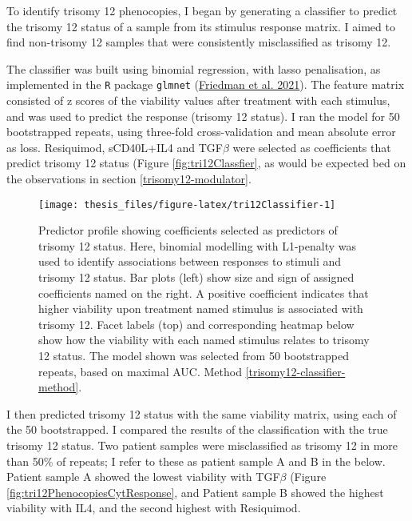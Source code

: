 \documentclass[11pt, a4paper, twosided]{book}
\begin{document}
To identify trisomy 12 phenocopies, I began by generating a classifier to predict the trisomy 12 status of a sample from its stimulus response matrix. I aimed to find non-trisomy 12 samples that were consistently misclassified as trisomy 12.

The classifier was built using binomial regression, with lasso penalisation, as implemented in the \texttt{R} package \texttt{glmnet} (\protect\hyperlink{ref-R-glmnet}{Friedman et al. 2021}). The feature matrix consisted of z scores of the viability values after treatment with each stimulus, and was used to predict the response (trisomy 12 status). I ran the model for 50 bootstrapped repeats, using three-fold cross-validation and mean absolute error as loss. Resiquimod, sCD40L+IL4 and TGF\(\beta\) were selected as coefficients that predict trisomy 12 status (Figure \ref{fig:tri12Classfier}, as would be expected bed on the observations in section \ref{trisomy12-modulator}.


\begin{figure}

{\centering \texttt{[image: thesis\_files/figure-latex/tri12Classifier-1]} 

}

\caption{Predictor profile showing coefficients selected as predictors of trisomy 12 status. Here, binomial modelling with L1-penalty was used to identify associations between responses to stimuli and trisomy 12 status. Bar plots (left) show size and sign of assigned coefficients named on the right. A positive coefficient indicates that higher viability upon treatment named stimulus is associated with trisomy 12. Facet labels (top) and corresponding heatmap below show how the viability with each named stimulus relates to trisomy 12 status. The model shown was selected from 50 bootstrapped repeats, based on maximal AUC. Method \ref{trisomy12-classifier-method}.}\label{fig:tri12Classifier}
\end{figure}
I then predicted trisomy 12 status with the same viability matrix, using each of the 50 bootstrapped. I compared the results of the classification with the true trisomy 12 status. Two patient samples were misclassified as trisomy 12 in more than 50\% of repeats; I refer to these as patient sample A and B in the below. Patient sample A showed the lowest viability with TGF\(\beta\) (Figure \ref{fig:tri12PhenocopiesCytResponse}, and Patient sample B showed the highest viability with IL4, and the second highest with Resiquimod.
\end{document}
